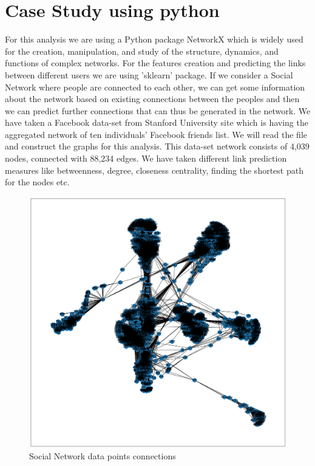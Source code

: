 \documentclass{article}
\begin{document}
\section{Case Study using python}
For this analysis we are using a Python package NetworkX which is widely used for the creation, manipulation, and study of the structure, dynamics, and functions of complex networks. For the features creation and predicting the links between different users we are using 'sklearn' package.
\newline
If we consider a Social Network where people are connected to each other, we can get some information about the network based on existing connections between the peoples and then we can predict further connections that can thus be generated in the network.
\newline
We have taken a Facebook data-set from Stanford University site which is having the aggregated network of ten individuals’ Facebook friends list. We will read the file and construct the graphs for this analysis. This data-set network consists of 4,039 nodes, connected with 88,234 edges.
\newline
We have taken different link prediction measures like betweenness, degree, closeness centrality, finding the shortest path for the nodes etc. 
\begin{figure}[ht]
\centering
\includegraphics[scale=0.22]{sos_net.png}
\caption{Social Network data points connections}
\end{figure}
\end{document}
